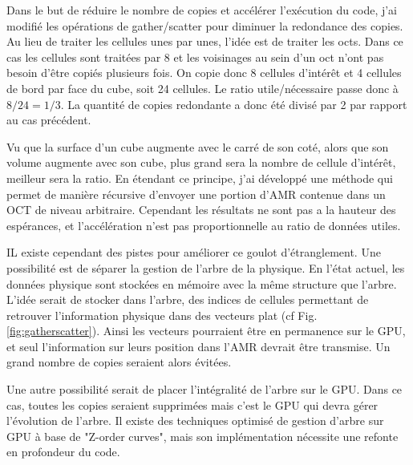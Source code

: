 Dans le but de réduire le nombre de copies et accélérer l'exécution du code, j'ai modifié les opérations de gather/scatter pour diminuer la redondance des copies.
Au lieu de traiter les cellules unes par unes, l'idée est de traiter les octs.
Dans ce cas les cellules sont traitées par 8 et les voisinages au sein d'un oct n'ont pas besoin d'être copiés plusieurs fois.
On copie donc 8 cellules d'intérêt et 4 cellules de bord par face du cube, soit 24 cellules.
Le ratio utile/nécessaire passe donc à $8/24 = 1/3$.
La quantité de copies redondante a donc été divisé par 2 par rapport au cas précédent.

Vu que la surface d'un cube augmente avec le carré de son coté, alors que son volume augmente avec son cube, plus grand sera la nombre de cellule d'intérêt, meilleur sera la ratio.
En étendant ce principe, j'ai développé une méthode qui permet de manière récursive d'envoyer une portion d'AMR contenue dans un OCT de niveau arbitraire.
Cependant les résultats ne sont pas a la hauteur des espérances, et l'accélération n'est pas proportionnelle au ratio de données utiles.

IL existe cependant des pistes pour améliorer ce goulot d'étranglement.
Une possibilité est de séparer la gestion de l'arbre de la physique.
En l'état actuel, les données physique sont stockées en mémoire avec la même structure que l'arbre.
L'idée serait de stocker dans l'arbre, des indices de cellules permettant de retrouver l'information physique dans des vecteurs plat (cf Fig. \ref{fig:gatherscatter}).
Ainsi les vecteurs pourraient être en permanence sur le GPU, et seul l'information sur leurs position dans l'AMR devrait être transmise.
Un grand nombre de copies seraient alors évitées. 

Une autre possibilité serait de placer l'intégralité de l'arbre sur le GPU.
Dans ce cas, toutes les copies seraient supprimées mais c'est le GPU qui devra gérer l'évolution de l'arbre. 
Il existe des techniques optimisé de gestion d'arbre sur GPU à base de "Z-order curves", mais son implémentation nécessite une refonte en profondeur du code.






